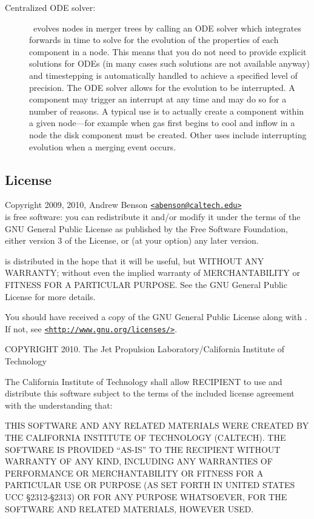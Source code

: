 \begin{description}
 \item [Centralized ODE solver:] \glc\ evolves nodes in merger trees by calling an ODE solver which integrates forwards in time to solve for the evolution of the properties of each component in a node. This means that you do not need to provide explicit solutions for ODEs (in many cases such solutions are not available anyway) and timestepping is automatically handled to achieve a specified level of precision. The ODE solver allows for the evolution to be interrupted. A component may trigger an interrupt at any time and may do so for a number of reasons. A typical use is to actually create a component within a given node---for example when gas first begins to cool and inflow in a node the disk component must be created. Other uses include interrupting evolution when a merging event occurs.
\end{description}

\subsection{License}

Copyright 2009, 2010, Andrew Benson \href{mailto:abenson@caltech.edu}{\tt <abenson@caltech.edu>}\\

\glc is free software: you can redistribute it and/or modify
it under the terms of the GNU General Public License as published by
the Free Software Foundation, either version 3 of the License, or
(at your option) any later version.

\glc is distributed in the hope that it will be useful,
but WITHOUT ANY WARRANTY; without even the implied warranty of
MERCHANTABILITY or FITNESS FOR A PARTICULAR PURPOSE.  See the
GNU General Public License for more details.

You should have received a copy of the GNU General Public License
along with \glc.  If not, see \href{http://www.gnu.org/licenses/}{\tt <http://www.gnu.org/licenses/>}.


COPYRIGHT 2010. The Jet Propulsion Laboratory/California Institute of Technology

The California Institute of Technology shall allow RECIPIENT to use and
distribute this software subject to the terms of the included license
agreement with the understanding that:

THIS SOFTWARE AND ANY RELATED MATERIALS WERE CREATED BY THE CALIFORNIA
INSTITUTE OF TECHNOLOGY (CALTECH). THE SOFTWARE IS PROVIDED ``AS-IS'' TO
THE RECIPIENT WITHOUT WARRANTY OF ANY KIND, INCLUDING ANY WARRANTIES OF
PERFORMANCE OR MERCHANTABILITY OR FITNESS FOR A PARTICULAR USE OR
PURPOSE (AS SET FORTH IN UNITED STATES UCC \S2312-§2313) OR FOR ANY
PURPOSE WHATSOEVER, FOR THE SOFTWARE AND RELATED MATERIALS, HOWEVER
USED.

